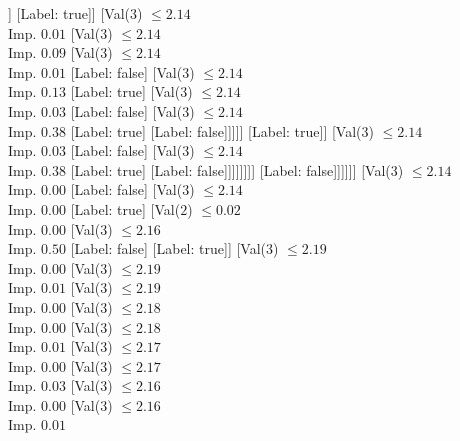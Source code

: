 \documentclass[margin=10pt]{standalone}
\begin{document}
\begin{forest}
																							]
																						[Label: true]]
																					[Val($3$) $ \leq 2.14$ \\ Imp. $0.01$
																						[Val($3$) $ \leq 2.14$ \\ Imp. $0.09$
																							[Val($3$) $ \leq 2.14$ \\ Imp. $0.01$
																								[Label: false]
																								[Val($3$) $ \leq 2.14$ \\ Imp. $0.13$
																									[Label: true]
																									[Val($3$) $ \leq 2.14$ \\ Imp. $0.03$
																										[Label: false]
																										[Val($3$) $ \leq 2.14$ \\ Imp. $0.38$
																											[Label: true]
																											[Label: false]]]]]
																							[Label: true]]
																						[Val($3$) $ \leq 2.14$ \\ Imp. $0.03$
																							[Label: false]
																							[Val($3$) $ \leq 2.14$ \\ Imp. $0.38$
																								[Label: true]
																								[Label: false]]]]]]]]
																	[Label: false]]]]]]
												[Val($3$) $ \leq 2.14$ \\ Imp. $0.00$
													[Label: false]
													[Val($3$) $ \leq 2.14$ \\ Imp. $0.00$
														[Label: true]
														[Val($2$) $ \leq 0.02$ \\ Imp. $0.00$
															[Val($3$) $ \leq 2.16$ \\ Imp. $0.50$
																[Label: false]
																[Label: true]]
															[Val($3$) $ \leq 2.19$ \\ Imp. $0.00$
																[Val($3$) $ \leq 2.19$ \\ Imp. $0.01$
																	[Val($3$) $ \leq 2.19$ \\ Imp. $0.00$
																		[Val($3$) $ \leq 2.18$ \\ Imp. $0.00$
																			[Val($3$) $ \leq 2.18$ \\ Imp. $0.01$
																				[Val($3$) $ \leq 2.17$ \\ Imp. $0.00$
																					[Val($3$) $ \leq 2.17$ \\ Imp. $0.03$
																						[Val($3$) $ \leq 2.16$ \\ Imp. $0.00$
																							[Val($3$) $ \leq 2.16$ \\ Imp. $0.01$

\end{forest}
\end{document}
